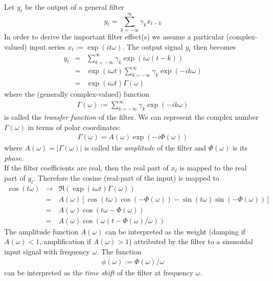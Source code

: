 \documentclass[a4paper]{book}
\begin{document}
Let $y_t$ be the output of a general filter
\[y_t=\sum_{k=-\infty}^{\infty}\gamma_kx_{t-k}\]
In order to derive the important filter effect(s) we assume a particular (complex-valued)
input series $x_t:=\exp(it\omega )$. The output signal $y_t$ then becomes
\begin{eqnarray}\label{aidehh}
y_{t}&=&\sum_{k=-\infty}^{\infty}{\gamma}_{k}\exp(i\omega(t-k))\\
&=&\exp(i\omega t)\sum_{k=-\infty}^{\infty}{\gamma}_{k}\exp(-ik\omega)\\
&=&\exp(i\omega t){\Gamma}(\omega)
\end{eqnarray}
where the (generally complex-valued) function
\begin{eqnarray}
\Gamma(\omega):=\sum_{k=-\infty}^{\infty}{\gamma}_k\exp(-ik\omega)
\end{eqnarray}
is called the \emph{transfer function} of the filter. We can represent the complex number $\Gamma(\omega)$ in terms of polar coordinates:
\begin{eqnarray}
\Gamma(\omega)=A(\omega)\exp(-i\Phi(\omega))
\end{eqnarray}
where $A(\omega)=|\Gamma(\omega)|$ is called the \emph{amplitude} of the filter and $\Phi(\omega)$ is its \emph{phase}. \\


If the filter coefficients are real, then the real part
of $x_t$ is mapped to the real part of $y_{t}$. Therefore the cosine (real-part of the input) is mapped to
\begin{eqnarray}
\cos(t\omega)&\to& \Re(\exp(i\omega t){\Gamma}(\omega))\\
&=&A(\omega)\left[
\cos(t\omega)\cos(-{\Phi}(\omega))-\sin(t\omega)
\sin(-{\Phi}(\omega))\right]\nonumber\\
&=&A(\omega)\cos(t\omega-{\Phi}(\omega))\nonumber\\
&=&A(\omega) \cos(\omega(t-{\Phi}(\omega)/\omega)) \label{costocosphi}
\end{eqnarray}
The amplitude function \(A(\omega)\) can be interpreted as the weight (damping if \(A(\omega)<1\), amplification if
\(A(\omega)>1\)) attributed by the filter to a sinusoidal input signal
with frequency \(\omega\). The function
\begin{eqnarray}\label{tsfunc}
\phi(\omega):={\Phi}(\omega)/\omega
\end{eqnarray}
can be interpreted as the \emph{time shift} of the
filter at frequency \(\omega\).\\
\end{document}
